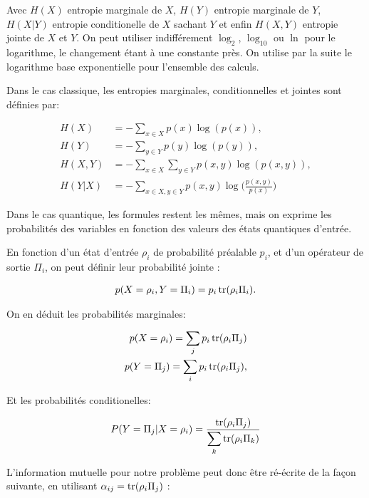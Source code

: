 Avec $H(X)$ entropie marginale de $X$, $H(Y)$ entropie marginale de $Y$, $H(X|Y)$ entropie conditionelle de $X$ sachant $Y$ et enfin $H(X, Y)$ entropie jointe de $X$ et $Y$. On peut utiliser indifférement $\log_2$, $\log_{10}$ ou $\ln$ pour le logarithme, le changement étant à une constante près. On utilise par la suite le logarithme base exponentielle pour l'ensemble des calculs.

Dans le cas classique, les entropies marginales, conditionnelles et jointes sont définies par: 

\begin{align}
    H(X) &= -\displaystyle \sum_{x \in X} p(x) \log(p(x)) , \\
    H(Y) &= -\displaystyle \sum_{y \in Y} p(y) \log(p(y)) , \\
    H(X, Y) &= -\displaystyle \sum_{x \in X} \displaystyle \sum_{y \in Y} p(x, y) \log(p(x, y)), \\
    H(Y|X) &= -\displaystyle \sum_{x \in X, y \in Y} p(x, y) \log \big(\frac{p(x, y)}{p(x)}\big)
\end{align}

Dans le cas quantique, les formules restent les mêmes, mais on exprime les probabilités des variables en fonction des valeurs des états quantiques d'entrée.

En fonction d'un état d'entrée $\rho_i$ de probabilité préalable $p_i$, et d'un opérateur de sortie $\Pi_i$, on peut définir leur probabilité jointe :

\begin{align}
    p(X = \rho_i, Y = \Pi_i) = p_i \operatorname{tr}(\rho_i \Pi_i).
\end{align}

On en déduit les probabilités marginales:

\begin{align}
    p(X = \rho_i) = \displaystyle \sum_{j}p_i \operatorname{tr}(\rho_i \Pi_j)  \\
    p(Y = \Pi_j) = \displaystyle \sum_{i}p_i \operatorname{tr}(\rho_i \Pi_j),
\end{align}

Et les probabilités conditionelles:

\begin{align}
    P(Y=\Pi_j | X=\rho_i) = \frac{\operatorname{tr}(\rho_i \Pi_j)}{\displaystyle \sum_{k} \operatorname{tr}(\rho_i \Pi_k)}
\end{align}

L'information mutuelle pour notre problème peut donc être ré-écrite de la façon suivante, en utilisant $\alpha_{ij} = \operatorname{tr}(\rho_i \Pi_j)$ :

